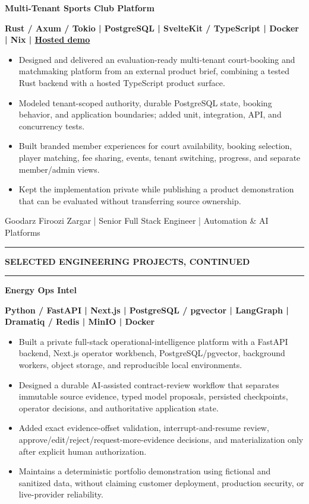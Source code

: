 \documentclass[10pt,a4paper]{article}
\newcommand{\cvsection}[1]{%
  \Needspace{4\baselineskip}%
  \vspace{0.42em}%
  {\fontsize{10.2}{11.9}\selectfont\bfseries\color{navy}\MakeUppercase{#1}}\par
  \vspace{0.16em}\color{rule}\hrule\color{text}\vspace{0.30em}%
}
\newcommand{\project}[2]{%
  \Needspace{6\baselineskip}%
  {\fontsize{10.35}{12.1}\selectfont\bfseries\color{navy}#1}\par
  {\fontsize{9.05}{10.6}\selectfont\color{muted}\bfseries #2}\par
}
\newcommand{\pageidentity}{%
  {\fontsize{8.45}{9.9}\selectfont\color{muted}Goodarz Firoozi Zargar | Senior Full Stack Engineer | Automation \& AI Platforms}\par
  \vspace{0.25em}\color{rule}\hrule\color{text}\vspace{0.38em}%
}
\begin{document}
\project{Multi-Tenant Sports Club Platform}{Rust / Axum / Tokio | PostgreSQL | SvelteKit / TypeScript | Docker | Nix | \href{https://multi-tenant-padle-club-z29muw8ur-screensurfers-projects.vercel.app/play-lab}{Hosted demo}}
\begin{itemize}
  \item Designed and delivered an evaluation-ready multi-tenant court-booking and matchmaking platform from an external product brief, combining a tested Rust backend with a hosted TypeScript product surface.
  \item Modeled tenant-scoped authority, durable PostgreSQL state, booking behavior, and application boundaries; added unit, integration, API, and concurrency tests.
  \item Built branded member experiences for court availability, booking selection, player matching, fee sharing, events, tenant switching, progress, and separate member/admin views.
  \item Kept the implementation private while publishing a product demonstration that can be evaluated without transferring source ownership.
\end{itemize}

\newpage
\pageidentity

\cvsection{Selected Engineering Projects, Continued}

\project{Energy Ops Intel}{Python / FastAPI | Next.js | PostgreSQL / pgvector | LangGraph | Dramatiq / Redis | MinIO | Docker}
\begin{itemize}
  \item Built a private full-stack operational-intelligence platform with a FastAPI backend, Next.js operator workbench, PostgreSQL/pgvector, background workers, object storage, and reproducible local environments.
  \item Designed a durable AI-assisted contract-review workflow that separates immutable source evidence, typed model proposals, persisted checkpoints, operator decisions, and authoritative application state.
  \item Added exact evidence-offset validation, interrupt-and-resume review, approve/edit/reject/request-more-evidence decisions, and materialization only after explicit human authorization.
  \item Maintains a deterministic portfolio demonstration using fictional and sanitized data, without claiming customer deployment, production security, or live-provider reliability.
\end{itemize}
\end{document}
